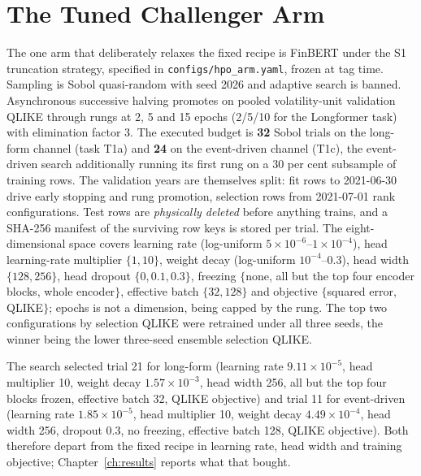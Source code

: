 \FloatBarrier
\section{The Tuned Challenger Arm}
\label{app:hyperparams:asha}

The one arm that deliberately relaxes the fixed recipe is FinBERT under the S1
truncation strategy, specified in
\texttt{configs/hpo\_arm.yaml}, frozen at tag time.
Sampling is Sobol
quasi-random with seed 2026 and adaptive search is banned. Asynchronous
successive halving promotes on pooled volatility-unit validation QLIKE through
rungs at 2, 5 and 15 epochs (2/5/10 for the Longformer task) with elimination
factor 3. The executed budget is \textbf{32} Sobol trials on the long-form
channel (task T1a) and \textbf{24} on the event-driven channel (T1c), the
event-driven search additionally running its first rung on a 30 per cent
subsample of training rows. %
The validation years are themselves split: fit rows to 2021-06-30 drive early
stopping and rung promotion, selection rows from 2021-07-01 rank configurations.
Test rows are \emph{physically deleted} before anything trains, and a SHA-256
manifest of the surviving row keys is stored per trial. %
The eight-dimensional space covers learning rate (log-uniform
$5\times10^{-6}$--$1\times10^{-4}$), head learning-rate multiplier $\{1, 10\}$,
weight decay (log-uniform $10^{-4}$--0.3), head width $\{128, 256\}$, head dropout
$\{0, 0.1, 0.3\}$, freezing $\{$none, all but the top four encoder blocks, whole
encoder$\}$, effective
batch $\{32, 128\}$ and objective $\{$squared error, QLIKE$\}$; epochs is not a
dimension, being capped by the rung. %
The top two configurations by selection QLIKE were retrained under all three
seeds, the winner being the lower three-seed ensemble selection QLIKE.

The search selected trial 21 for long-form (learning rate
$9.11\times10^{-5}$, head multiplier 10, weight decay $1.57\times10^{-3}$, head
width 256, all but the top four blocks frozen, effective batch 32, QLIKE
objective) and trial 11 for event-driven (learning rate
$1.85\times10^{-5}$, head multiplier 10, weight decay $4.49\times10^{-4}$, head
width 256, dropout 0.3, no freezing, effective batch 128, QLIKE objective). %
Both therefore depart from the fixed recipe in learning rate, head width and
training objective; Chapter~\ref{ch:results} reports what that bought.

